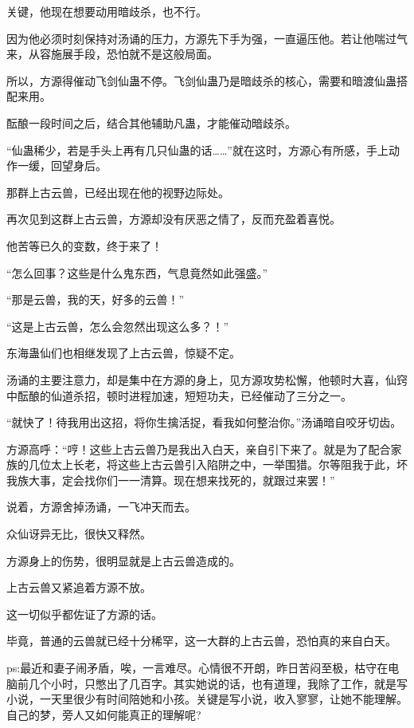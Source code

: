 \begin{this_body}
关键，他现在想要动用暗歧杀，也不行。

因为他必须时刻保持对汤诵的压力，方源先下手为强，一直逼压他。若让他喘过气来，从容施展手段，恐怕就不是这般局面。

所以，方源得催动飞剑仙蛊不停。飞剑仙蛊乃是暗歧杀的核心，需要和暗渡仙蛊搭配来用。

酝酿一段时间之后，结合其他辅助凡蛊，才能催动暗歧杀。

“仙蛊稀少，若是手头上再有几只仙蛊的话……”就在这时，方源心有所感，手上动作一缓，回望身后。

那群上古云兽，已经出现在他的视野边际处。

再次见到这群上古云兽，方源却没有厌恶之情了，反而充盈着喜悦。

他苦等已久的变数，终于来了！

“怎么回事？这些是什么鬼东西，气息竟然如此强盛。”

“那是云兽，我的天，好多的云兽！”

“这是上古云兽，怎么会忽然出现这么多？！”

东海蛊仙们也相继发现了上古云兽，惊疑不定。

汤诵的主要注意力，却是集中在方源的身上，见方源攻势松懈，他顿时大喜，仙窍中酝酿的仙道杀招，顿时进程加速，短短功夫，已经催动了三分之一。

“就快了！待我用出这招，将你生擒活捉，看我如何整治你。”汤诵暗自咬牙切齿。

方源高呼：“哼！这些上古云兽乃是我出入白天，亲自引下来了。就是为了配合家族的几位太上长老，将这些上古云兽引入陷阱之中，一举围猎。尔等阻我于此，坏我族大事，定会找你们一一清算。现在想来找死的，就跟过来罢！”

说着，方源舍掉汤诵，一飞冲天而去。

众仙讶异无比，很快又释然。

方源身上的伤势，很明显就是上古云兽造成的。

上古云兽又紧追着方源不放。

这一切似乎都佐证了方源的话。

毕竟，普通的云兽就已经十分稀罕，这一大群的上古云兽，恐怕真的来自白天。

ps:最近和妻子闹矛盾，唉，一言难尽。心情很不开朗，昨日苦闷至极，枯守在电脑前几个小时，只憋出了几百字。其实她说的话，也有道理，我除了工作，就是写小说，一天里很少有时间陪她和小孩。关键是写小说，收入寥寥，让她不能理解。自己的梦，旁人又如何能真正的理解呢?

\end{this_body}

